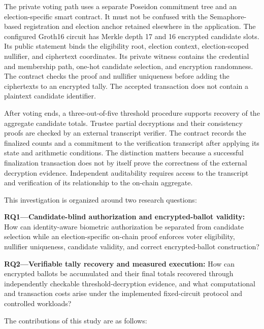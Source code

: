 The private voting path uses a separate Poseidon commitment tree and an election-specific smart contract. It must not be confused with the Semaphore-based registration and election anchor retained elsewhere in the application. The configured Groth16 circuit has Merkle depth 17 and 16 encrypted candidate slots. Its public statement binds the eligibility root, election context, election-scoped nullifier, and ciphertext coordinates. Its private witness contains the credential and membership path, one-hot candidate selection, and encryption randomness. The contract checks the proof and nullifier uniqueness before adding the ciphertexts to an encrypted tally. The accepted transaction does not contain a plaintext candidate identifier.

After voting ends, a three-out-of-five threshold procedure supports recovery of the aggregate candidate totals. Trustee partial decryptions and their consistency proofs are checked by an external transcript verifier. The contract records the finalized counts and a commitment to the verification transcript after applying its state and arithmetic conditions. The distinction matters because a successful finalization transaction does not by itself prove the correctness of the external decryption evidence. Independent auditability requires access to the transcript and verification of its relationship to the on-chain aggregate.

This investigation is organized around two research questions:

\noindent\textbf{RQ1---Candidate-blind authorization and encrypted-ballot validity:} How can identity-aware biometric authorization be separated from candidate selection while an election-specific on-chain proof enforces voter eligibility, nullifier uniqueness, candidate validity, and correct encrypted-ballot construction?

\noindent\textbf{RQ2---Verifiable tally recovery and measured execution:} How can encrypted ballots be accumulated and their final totals recovered through independently checkable threshold-decryption evidence, and what computational and transaction costs arise under the implemented fixed-circuit protocol and controlled workloads?

The contributions of this study are as follows:

